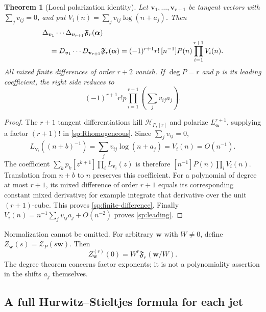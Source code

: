 \documentclass[11pt,letterpaper]{article}
\numberwithin{equation}{section}
\theoremstyle{plain}
\newtheorem{theorem}{Theorem}[section]
\theoremstyle{definition}
\theoremstyle{remark}
\newcommand{\cZ}{\mathcal Z}
\newcommand{\cH}{\mathcal H}
\begin{document}
\begin{theorem}[Local polarization identity]\label{sp:thm:polarization}
Let $\boldsymbol v_1,\ldots,\boldsymbol v_{r+1}$ be tangent vectors
with $\sum_jv_{ij}=0$, and put
$V_i(n)=\sum_jv_{ij}\log(n+a_j)$. Then
\begin{align}\label{sp:finite-difference}
 &\Delta_{\boldsymbol v_1}\cdots\Delta_{\boldsymbol v_{r+1}}
       \mathfrak F_r(\boldsymbol\alpha)\notag\\
 &\quad=D_{\boldsymbol v_1}\cdots D_{\boldsymbol v_{r+1}}
       \mathfrak F_r(\boldsymbol\alpha)
       =(-1)^{r+1}r!\,[n^{-1}]P(n)\prod_{i=1}^{r+1}V_i(n).
\end{align}
All mixed finite differences of order $r+2$ vanish. If $\deg P=r$
and $p$ is its leading coefficient, the right side reduces to
\begin{equation}\label{sp:leading}
 (-1)^{r+1}r!p
             \prod_{i=1}^{r+1}\left(\sum_jv_{ij}a_j\right).
\end{equation}
\end{theorem}

\begin{proof}
The $r+1$ tangent differentiations kill $\cH_{P,[r]}$ and polarize
$L_{\boldsymbol\alpha}^{r+1}$, supplying a factor $(r+1)!$ in
\eqref{sp:Rhomogeneous}. Since $\sum_jv_{ij}=0$,
\[
 L_{\boldsymbol v_i}((n+b)^{-1})
   =\sum_jv_{ij}\log(n+a_j)=V_i(n)=O(n^{-1}).
\]
The coefficient $\sum_k p_k[z^{k+1}]\prod_iL_{\boldsymbol v_i}(z)$
is therefore $[n^{-1}]P(n)\prod_i V_i(n)$. Translation from $n+b$
to $n$ preserves this coefficient. For a polynomial of degree at most
$r+1$, its mixed difference of order $r+1$ equals its corresponding
constant mixed derivative; for example integrate that derivative over
the unit $(r+1)$-cube. This proves \eqref{sp:finite-difference}.
Finally $V_i(n)=n^{-1}\sum_jv_{ij}a_j+O(n^{-2})$ proves
\eqref{sp:leading}.
\end{proof}

Normalization cannot be omitted. For arbitrary $\boldsymbol w$ with
$W\ne0$, define $Z_{\boldsymbol w}(s)=\cZ_P(s\boldsymbol w)$.
Then
\begin{equation}\label{sp:scaling}
 Z_{\boldsymbol w}^{(r)}(0)
       =W^r\mathfrak F_r(\boldsymbol w/W).
\end{equation}
The degree theorem concerns factor exponents; it is not a polynomiality
assertion in the shifts $a_j$ themselves.

\subsection{A full Hurwitz--Stieltjes formula for each jet}
\end{document}
